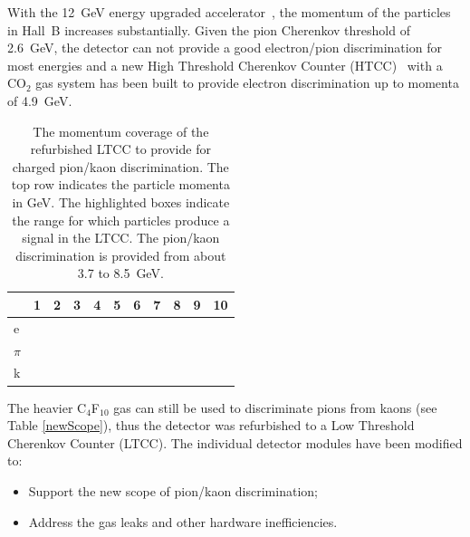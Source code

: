 With the 12~GeV energy upgraded accelerator~\cite{TDR12}, the momentum of the particles in Hall~B increases
substantially. Given the pion Cherenkov threshold of 2.6~GeV, the detector can not provide a good electron/pion
discrimination for most energies and a new High Threshold Cherenkov Counter (HTCC)~\cite{htcc-nim} with a
CO$_2$ gas system has been built to provide electron discrimination up to momenta of 4.9~GeV.

\begin{table}[h]
    \small
	\begin{center}
        \begin{tabular}{ | p{5mm} | p{2.5mm} | p{2.5mm} | p{2.5mm} | p{2.5mm} | p{2.5mm} | p{2.5mm} | p{2.5mm} | p{2.5mm} | p{2.5mm} |p{2.5mm} |}
			\hline \hline
			 & 1 & 2 & 3 & 4 & 5 & 6 & 7 & 8 & 9 & 10      \\
			\hline
             e  & \cellcolor{grey} & \cellcolor{grey} & \cellcolor{grey}
                & \cellcolor{grey} & \cellcolor{grey} & \cellcolor{grey}
                & \cellcolor{grey} & \cellcolor{grey} & \cellcolor{grey} & \cellcolor{grey}  \\
         $\pi$  &  &  &
                & \cellcolor{grey} & \cellcolor{grey} & \cellcolor{grey}
                & \cellcolor{grey} & \cellcolor{grey} & \cellcolor{grey} & \cellcolor{grey}  \\
             k  & & & & & & &
                & \cellcolor{grey} & \cellcolor{grey} & \cellcolor{grey} \\
			\hline \hline
		\end{tabular}
	\end{center}
	\caption{The momentum coverage of the refurbished LTCC to provide for charged pion/kaon discrimination.
        The top row indicates the particle momenta in GeV. The highlighted boxes indicate the range for which particles
        produce a signal in the LTCC. The pion/kaon discrimination is provided from about 3.7 to 8.5~GeV.}\label{tab:newScope}
\end{table}


The heavier C$_4$F$_{10}$ gas can still be used to discriminate pions from kaons (see Table \ref{newScope}), thus the
detector was refurbished to a Low Threshold Cherenkov Counter (LTCC). The individual detector modules have
been modified to:

\begin{itemize}
	\item Support the new scope of pion/kaon discrimination;
	\item Address the gas leaks and other hardware inefficiencies.
\end{itemize}
